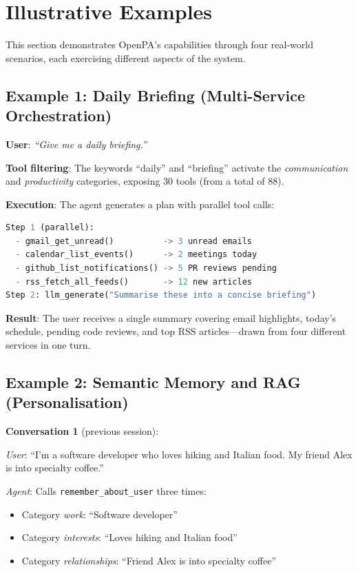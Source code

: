 \section{Illustrative Examples}
\label{sec:examples}

This section demonstrates OpenPA's capabilities through four real-world scenarios, each exercising different aspects of the system.

\subsection{Example 1: Daily Briefing (Multi-Service Orchestration)}

\textbf{User}: \textit{``Give me a daily briefing.''}

\textbf{Tool filtering}: The keywords ``daily'' and ``briefing'' activate the \textit{communication} and \textit{productivity} categories, exposing 30 tools (from a total of 88).

\textbf{Execution}: The agent generates a plan with parallel tool calls:

\begin{lstlisting}[language=Python, caption={Daily briefing plan execution}]
Step 1 (parallel):
  - gmail_get_unread()          -> 3 unread emails
  - calendar_list_events()      -> 2 meetings today
  - github_list_notifications() -> 5 PR reviews pending
  - rss_fetch_all_feeds()       -> 12 new articles
Step 2: llm_generate("Summarise these into a concise briefing")
\end{lstlisting}

\textbf{Result}: The user receives a single summary covering email highlights, today's schedule, pending code reviews, and top RSS articles---drawn from four different services in one turn.

\subsection{Example 2: Semantic Memory and RAG (Personalisation)}

\textbf{Conversation 1} (previous session):

\textit{User}: ``I'm a software developer who loves hiking and Italian food. My friend Alex is into specialty coffee.''

\textit{Agent}: Calls \texttt{remember\_about\_user} three times:
\begin{itemize}
  \item Category \textit{work}: ``Software developer''
  \item Category \textit{interests}: ``Loves hiking and Italian food''
  \item Category \textit{relationships}: ``Friend Alex is into specialty coffee''
\end{itemize}

